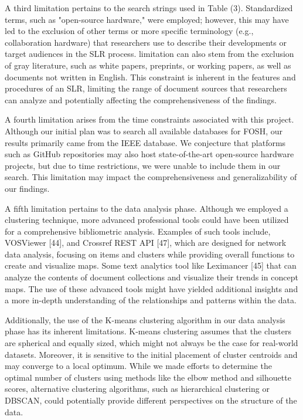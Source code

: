 A third limitation pertains to the search strings used in Table (3). Standardized terms, such as "open-source hardware," were employed; however, this may have led to the exclusion of other terms or more specific terminology (e.g., collaboration hardware) that researchers use to describe their developments or target audiences in the SLR process.
limitation can also stem from the exclusion of gray literature, such as white papers, preprints, or working papers, as well as documents not written in English. This constraint is inherent in the features and procedures of an SLR, limiting the range of document sources that researchers can analyze and potentially affecting the comprehensiveness of the findings.

A fourth limitation arises from the time constraints associated with this project. Although our initial plan was to search all available databases for FOSH, our results primarily came from the IEEE database. We conjecture that platforms such as GitHub repositories may also host state-of-the-art open-source hardware projects, but due to time restrictions, we were unable to include them in our search. This limitation may impact the comprehensiveness and generalizability of our findings.

A fifth limitation pertains to the data analysis phase. Although we employed a clustering technique, more advanced professional tools could have been utilized for a comprehensive bibliometric analysis. Examples of such tools include, VOSViewer [44], and Crossref REST API [47], which are designed for network data analysis, focusing on items and clusters while providing overall functions to create and visualize maps. Some text analytics tool like Leximancer [45] that can analyze the contents of document collections and visualize their trends in concept maps. The use of these advanced tools might have yielded additional insights and a more in-depth understanding of the relationships and patterns within the data.

Additionally, the use of the K-means clustering algorithm in our data analysis phase has its inherent limitations. K-means clustering assumes that the clusters are spherical and equally sized, which might not always be the case for real-world datasets. Moreover, it is sensitive to the initial placement of cluster centroids and may converge to a local optimum. While we made efforts to determine the optimal number of clusters using methods like the elbow method and silhouette scores, alternative clustering algorithms, such as hierarchical clustering or DBSCAN, could potentially provide different perspectives on the structure of the data.